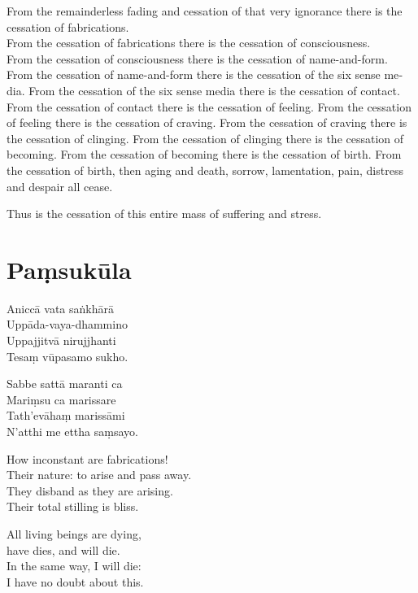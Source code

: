\begin{english}
  From the remainderless fading and cessation of that very ignorance there is the
  cessation of fabrications.\\
From the cessation of fabrications there is the cessation of consciousness.\\
From the cessation of consciousness there is the cessation of name-and-form.
From the cessation of name-and-form there is the cessation of the six sense media.
From the cessation of the six sense media there is the cessation of contact.
From the cessation of contact there is the cessation of feeling.
From the cessation of feeling there is the cessation of craving.
From the cessation of craving there is the cessation of clinging.
From the cessation of clinging there is the cessation of becoming.
From the cessation of becoming there is the cessation of birth.
From the cessation of birth, then aging and death, sorrow, lamentation, pain,
  distress and despair all cease.

Thus is the cessation of this entire mass of suffering and stress.
\end{english}



\section{Paṃsukūla}





Aniccā vata saṅkhārā\\
Uppāda-vaya-dhammino\\
Uppajjitvā nirujjhanti\\
Tesaṃ vūpasamo sukho.

Sabbe sattā maranti ca\\
Mariṃsu ca marissare\\
Tath'evāhaṃ marissāmi\\
N'atthi me ettha saṃsayo.

\begin{english}
  How inconstant are fabrications!\\
  Their nature: to arise and pass away.\\
  They disband as they are arising.\\
  Their total stilling is bliss.

  All living beings are dying,\\
  have dies, and will die.\\
  In the same way, I will die:\\
  I have no doubt about this.
\end{english}

